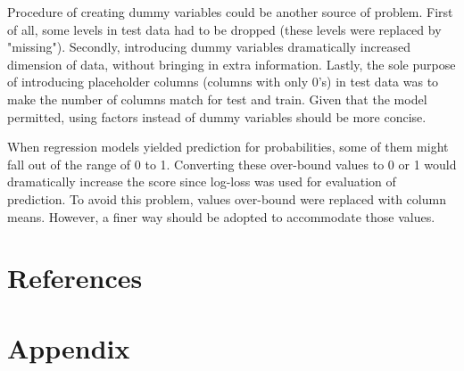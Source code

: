 \documentclass{article}\usepackage[]{graphicx}\usepackage[]{color}
\begin{document}
Procedure of creating dummy variables could be another source of problem. First of all, some levels in test data had to be dropped (these levels were replaced by "missing"). Secondly, introducing dummy variables dramatically increased dimension of data, without bringing in extra information. Lastly, the sole purpose of introducing placeholder columns (columns with only 0's) in test data was to make the number of columns match for test and train. Given that the model permitted, using factors instead of dummy variables should be more concise.

When regression models yielded prediction for probabilities, some of them might fall out of the range of 0 to 1. Converting these over-bound values to 0 or 1 would dramatically increase the score since log-loss was used for evaluation of prediction. To avoid this problem, values over-bound were replaced with column means. However, a finer way should be adopted to accommodate those values.  

\section{References}
\clearpage
\appendix
\section*{Appendix}
\label{sec:appendix}
\end{document}
